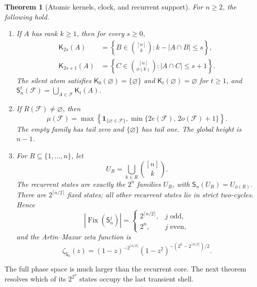 \documentclass[a4paper,10pt]{amsart}
\newtheorem{theorem}{Theorem}
\newcommand{\cF}{\mathcal F}
\newcommand{\cS}{\mathsf S}
\newcommand{\cK}{\mathsf K}
\begin{document}
\begin{theorem}[Atomic kernels, clock, and recurrent support]\label{thm:forward}
For $n\geq2$, the following hold.
\begin{enumerate}
\item If $A$ has rank $k\geq1$, then for every $s\geq0$,
\begin{align}
 \cK_{2s}(A)
 &=\left\{B\in\binom{[n]}k:k-|A\cap B|\leq s\right\},\label{eq:even}\\
 \cK_{2s+1}(A)
 &=\left\{C\in\binom{[n]}{\phi(k)}:|A\cap C|\leq s+1\right\}.
 \label{eq:odd}
\end{align}
The silent atom satisfies $\cK_0(\varnothing)=\{\varnothing\}$ and
$\cK_t(\varnothing)=\varnothing$ for $t\geq1$, and
$\cS_n^t(\cF)=\bigcup_{A\in\cF}\cK_t(A)$.
\item If $R(\cF)\neq\varnothing$, then
\begin{equation}\label{eq:clock}
 \mu(\cF)=\max\left\{\mathbf1_{\{\varnothing\in\cF\}},
 \min\{2e(\cF),\,2o(\cF)+1\}\right\}.
\end{equation}
The empty family has tail zero and $\{\varnothing\}$ has tail one.  The
global height is $n-1$.
\item For $R\subseteq\{1,\ldots,n\}$, let
\begin{equation}\label{eq:UR}
 U_R=\bigcup_{k\in R}\binom{[n]}k.
\end{equation}
The recurrent states are exactly the $2^n$ families $U_R$, with
$\cS_n(U_R)=U_{\phi(R)}$.  There are $2^{\lceil n/2\rceil}$ fixed states;
all other recurrent states lie in strict two-cycles.  Hence
\begin{equation}\label{eq:fix}
 |\operatorname{Fix}(\cS_n^j)|=
 \begin{cases}2^{\lceil n/2\rceil},&j\text{ odd},\\2^n,&j\text{ even},
 \end{cases}
\end{equation}
and the Artin--Mazur zeta function is
\begin{equation}\label{eq:zeta}
 \zeta_{\cS_n}(z)=
 (1-z)^{-2^{\lceil n/2\rceil}}
 (1-z^2)^{-(2^n-2^{\lceil n/2\rceil})/2}.
\end{equation}
\end{enumerate}
\end{theorem}

The full phase space is much larger than the recurrent core.  The next
theorem resolves which of its $2^{2^n}$ states occupy the last transient
shell.
\end{document}
